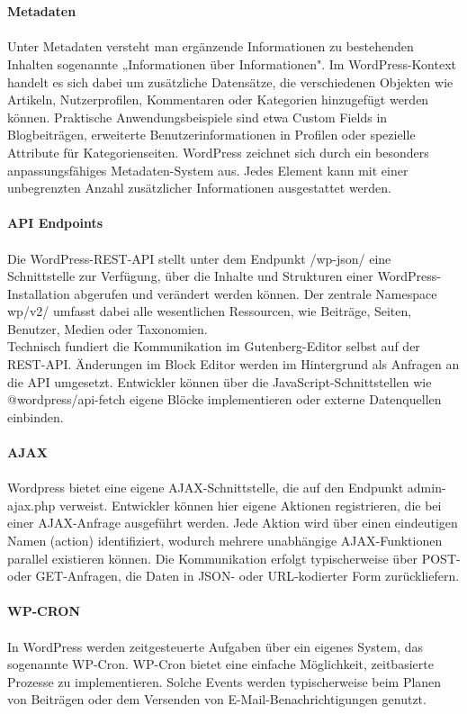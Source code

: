 \\
\\
\textbf{Metadaten}\\\\
Unter Metadaten versteht man ergänzende Informationen zu bestehenden Inhalten sogenannte „Informationen über Informationen".
Im WordPress-Kontext handelt es sich dabei um zusätzliche Datensätze, die verschiedenen Objekten wie Artikeln, Nutzerprofilen, Kommentaren oder Kategorien hinzugefügt werden können.
Praktische Anwendungsbeispiele sind etwa Custom Fields in Blogbeiträgen, erweiterte Benutzerinformationen in Profilen oder spezielle Attribute für Kategorienseiten.
WordPress zeichnet sich durch ein besonders anpassungsfähiges Metadaten-System aus.
Jedes Element kann mit einer unbegrenzten Anzahl zusätzlicher Informationen ausgestattet werden.
\\
\\
\textbf{API Endpoints}\\\\
Die WordPress-REST-API stellt unter dem Endpunkt /wp-json/ eine Schnittstelle zur Verfügung, über die Inhalte und Strukturen einer WordPress-Installation abgerufen und verändert werden können.
Der zentrale Namespace wp/v2/ umfasst dabei alle wesentlichen Ressourcen, wie Beiträge, Seiten, Benutzer, Medien oder Taxonomien.
\\
Technisch fundiert die Kommunikation im Gutenberg-Editor selbst auf der REST-API.
Änderungen im Block Editor werden im Hintergrund als Anfragen an die API umgesetzt.
Entwickler können über die JavaScript-Schnittstellen wie @wordpress/api-fetch eigene Blöcke implementieren oder externe Datenquellen einbinden.
\\
\\
\textbf{AJAX}\\\\
Wordpress bietet eine eigene AJAX-Schnittstelle, die auf den Endpunkt admin-ajax.php verweist.
Entwickler können hier eigene Aktionen registrieren, die bei einer AJAX-Anfrage ausgeführt werden.
Jede Aktion wird über einen eindeutigen Namen (action) identifiziert, wodurch mehrere unabhängige AJAX-Funktionen parallel existieren können.
Die Kommunikation erfolgt typischerweise über POST- oder GET-Anfragen, die Daten in JSON- oder URL-kodierter Form zurückliefern.
\\
\\
\textbf{WP-CRON}\\\\
In WordPress werden zeitgesteuerte Aufgaben über ein eigenes System, das sogenannte WP-Cron.
WP-Cron bietet eine einfache Möglichkeit, zeitbasierte Prozesse zu implementieren.
Solche Events werden typischerweise beim Planen von Beiträgen oder dem Versenden von E-Mail-Benachrichtigungen genutzt.

